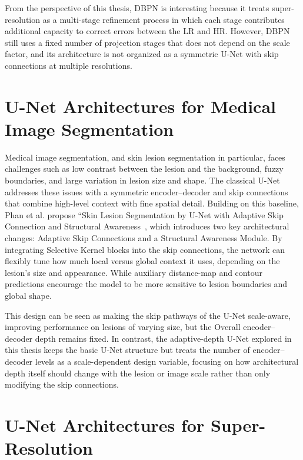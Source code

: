 From the perspective of this thesis, DBPN is interesting because it treats super-resolution as a multi-stage refinement process in which each stage contributes additional capacity to correct errors between the LR and HR. However, DBPN still uses a fixed number of projection stages that does not depend on the scale factor, and its architecture is not organized as a symmetric U-Net with skip connections at multiple resolutions.

\section{U-Net Architectures for Medical Image Segmentation}
\label{sec:rw-seg-unet}


Medical image segmentation, and skin lesion segmentation in particular,
faces challenges such as low contrast between the lesion and the background,
fuzzy boundaries, and large variation in lesion size and shape. The
classical U-Net~\cite{ronneberger2015unet} addresses these issues with
a symmetric encoder--decoder and skip connections that combine
high-level context with fine spatial detail. Building on this baseline,
Phan et al. propose ``Skin Lesion Segmentation by U-Net with Adaptive
Skip Connection and Structural Awareness~\cite {phan2023skin}, which
introduces two key architectural changes: Adaptive Skip Connections and
a Structural Awareness Module. By integrating Selective Kernel blocks into the skip connections, the network can flexibly tune how much local versus global context it uses, depending on the lesion’s size and appearance. While auxiliary distance-map and contour predictions encourage the model to be more sensitive to lesion boundaries and global
shape.

This design can be seen as making the skip pathways of the U-Net scale-aware, improving performance on lesions of varying size, but the Overall encoder--decoder depth remains fixed. In contrast, the adaptive-depth U-Net explored in this thesis keeps the basic U-Net structure but treats the number of encoder--decoder levels as a scale-dependent design variable, focusing on how architectural depth itself should change with the lesion or image scale rather than only modifying the skip connections.

\section{U-Net Architectures for Super-Resolution}
\label{sec:rw-sr-unet}

